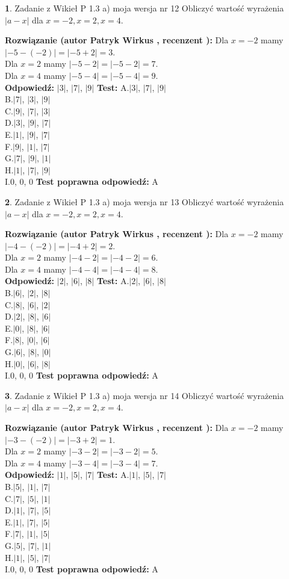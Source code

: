 \documentclass[12pt, a4paper]{article}
\theoremstyle{definition} %
\newtheorem{zad}{}
\newcommand{\zadStart}[1]{\begin{zad}#1\newline}
\newcommand{\zadStop}{\end{zad}}
\newcommand{\rozwStart}[2]{\noindent \textbf{Rozwiązanie (autor #1 , recenzent #2): }\newline}
\newcommand{\rozwStop}{\newline}
\newcommand{\odpStart}{\noindent \textbf{Odpowiedź:}\newline}
\newcommand{\odpStop}{\newline}
\newcommand{\testStart}{\noindent \textbf{Test:}\newline}
\newcommand{\testStop}{\newline}
\newcommand{\kluczStart}{\noindent \textbf{Test poprawna odpowiedź:}\newline}
\newcommand{\kluczStop}{\newline}
\begin{document}
\zadStart{Zadanie z Wikieł P 1.3 a) moja wersja nr 12}
Obliczyć wartość wyrażenia $|a - x|$ dla $x=-2,x=2,x=4$.
\zadStop
\rozwStart{Patryk Wirkus}{}
Dla $x = -2$ mamy $|-5 - (-2)| = |-5 + 2| = 3$.\\
Dla $x = 2$ mamy $|-5 - 2| = |-5 - 2| = 7$.\\
Dla $x = 4$ mamy $|-5 - 4| = |-5 - 4| = 9$.\\
\rozwStop
\odpStart
$|3|$, $|7|$, $|9|$
\odpStop
\testStart
A.$|3|$, $|7|$, $|9|$\\
B.$|7|$, $|3|$, $|9|$\\
C.$|9|$, $|7|$, $|3|$\\
D.$|3|$, $|9|$, $|7|$\\
E.$|1|$, $|9|$, $|7|$\\
F.$|9|$, $|1|$, $|7|$\\
G.$|7|$, $|9|$, $|1|$\\
H.$|1|$, $|7|$, $|9|$\\
I.$0$, $0$, $0$
\testStop
\kluczStart
A
\kluczStop



\zadStart{Zadanie z Wikieł P 1.3 a) moja wersja nr 13}
Obliczyć wartość wyrażenia $|a - x|$ dla $x=-2,x=2,x=4$.
\zadStop
\rozwStart{Patryk Wirkus}{}
Dla $x = -2$ mamy $|-4 - (-2)| = |-4 + 2| = 2$.\\
Dla $x = 2$ mamy $|-4 - 2| = |-4 - 2| = 6$.\\
Dla $x = 4$ mamy $|-4 - 4| = |-4 - 4| = 8$.\\
\rozwStop
\odpStart
$|2|$, $|6|$, $|8|$
\odpStop
\testStart
A.$|2|$, $|6|$, $|8|$\\
B.$|6|$, $|2|$, $|8|$\\
C.$|8|$, $|6|$, $|2|$\\
D.$|2|$, $|8|$, $|6|$\\
E.$|0|$, $|8|$, $|6|$\\
F.$|8|$, $|0|$, $|6|$\\
G.$|6|$, $|8|$, $|0|$\\
H.$|0|$, $|6|$, $|8|$\\
I.$0$, $0$, $0$
\testStop
\kluczStart
A
\kluczStop



\zadStart{Zadanie z Wikieł P 1.3 a) moja wersja nr 14}
Obliczyć wartość wyrażenia $|a - x|$ dla $x=-2,x=2,x=4$.
\zadStop
\rozwStart{Patryk Wirkus}{}
Dla $x = -2$ mamy $|-3 - (-2)| = |-3 + 2| = 1$.\\
Dla $x = 2$ mamy $|-3 - 2| = |-3 - 2| = 5$.\\
Dla $x = 4$ mamy $|-3 - 4| = |-3 - 4| = 7$.\\
\rozwStop
\odpStart
$|1|$, $|5|$, $|7|$
\odpStop
\testStart
A.$|1|$, $|5|$, $|7|$\\
B.$|5|$, $|1|$, $|7|$\\
C.$|7|$, $|5|$, $|1|$\\
D.$|1|$, $|7|$, $|5|$\\
E.$|1|$, $|7|$, $|5|$\\
F.$|7|$, $|1|$, $|5|$\\
G.$|5|$, $|7|$, $|1|$\\
H.$|1|$, $|5|$, $|7|$\\
I.$0$, $0$, $0$
\testStop
\kluczStart
A
\kluczStop
\end{document}
